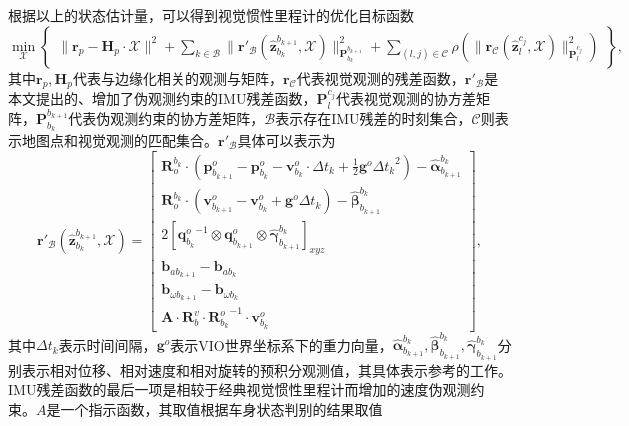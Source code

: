 根据以上的状态估计量，可以得到视觉惯性里程计的优化目标函数
\begin{equation}
  \min_{\mathcal{X}} 
  \begin{Bmatrix} 
  \| \symbf{r}_p - \symbf{H}_p \cdot \mathcal{X} \|^2 + \sum_{k\in\mathcal{B}} \| \symbf{r}'_{\mathcal{B}}(\hat{\symbf{z}}_{b_k}^{b_{k+1}}, \mathcal{X}) \|^2_{\symbf{P}_{b_k}^{b_{k+1}}}
  + \sum_{(l,j)\in\mathcal{C}} \rho(\| \symbf{r}_{\mathcal{C}}(\hat{\symbf{z}}_{l}^{c_j}, \mathcal{X}) \|^2_{\symbf{P}_{l}^{c_j}}) \end{Bmatrix},
\end{equation}
其中$\symbf{r}_p, \symbf{H}_p$代表与边缘化相关的观测与矩阵，$\symbf{r}_{\mathcal{C}}$代表视觉观测的残差函数，$\symbf{r}'_{\mathcal{B}}$是本文提出的、增加了伪观测约束的IMU残差函数，$\symbf{P}_{l}^{c_j}$代表视觉观测的协方差矩阵，$\symbf{P}_{b_k}^{b_{k+1}}$代表伪观测约束的协方差矩阵，$\mathcal{B}$表示存在IMU残差的时刻集合，$\mathcal{C}$则表示地图点和视觉观测的匹配集合。$\symbf{r}'_{\mathcal{B}}$具体可以表示为
\begin{equation}
  \symbf{r}'_{\mathcal{B}}(\hat{\symbf{z}}_{b_k}^{b_{k+1}}, \mathcal{X}) = 
  \begin{bmatrix} 
    \symbf{R}_o^{b_k} \cdot (\symbf{p}_{b_{k+1}}^o -\symbf{p}_{b_k}^o-\symbf{v}_{b_k}^o\cdot\Delta t_k + \frac{1}{2}\symbf{g}^o{\Delta t_k}^2) - \hat{\symbf{\alpha}}_{b_{k+1}}^{b_k} \\
    \symbf{R}_o^{b_k} \cdot (\symbf{v}_{b_{k+1}}^o - \symbf{v}_{b_k}^o + \symbf{g}^o\Delta t_k) - \hat{\symbf{\beta}}_{b_{k+1}}^{b_k} \\
    2[{\symbf{q}^o_{b_k}}^{-1}\otimes\symbf{q}_{b_{k+1}}^o \otimes \hat{\symbf{\gamma}}_{b_{k+1}}^{b_k}]_{xyz} \\
    \symbf{b}_{ab_{k+1}} - \symbf{b}_{ab_{k}} \\
    \symbf{b}_{\omega b_{k+1}} - \symbf{b}_{\omega b_{k}} \\
    \symbf{A} \cdot \symbf{R}_b^v \cdot {\symbf{R}_{b_k}^o}^{-1} \cdot \symbf{v}_{b_k}^o
  \end{bmatrix},
  \label{eq:imu_residual}
\end{equation}
其中$\Delta t_k$表示时间间隔，$\symbf{g}^o$表示VIO世界坐标系下的重力向量，$\hat{\symbf{\alpha}}_{b_{k+1}}^{b_k}, \hat{\symbf{\beta}}_{b_{k+1}}^{b_k}, \hat{\symbf{\gamma}}_{b_{k+1}}^{b_k}$分别表示相对位移、相对速度和相对旋转的预积分观测值，其具体表示参考\citet{qin2018vins}的工作。IMU残差函数的最后一项是相较于经典视觉惯性里程计而增加的速度伪观测约束。$A$是一个指示函数，其取值根据车身状态判别的结果取值
